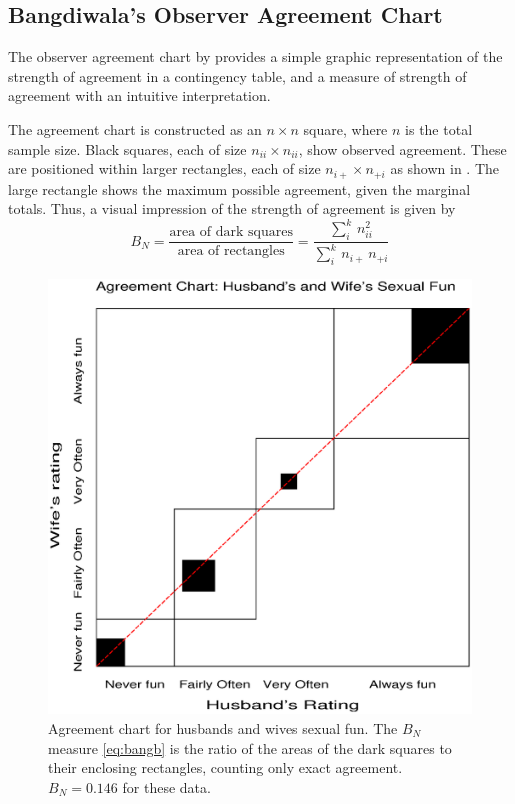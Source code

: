 \subsection[Observer Agreement Chart]{Bangdiwala's Observer Agreement Chart}
\label{sec:twoway:Bangdiwala}
The observer agreement chart by
\citet{Bangdiwala:87} provides a simple
graphic representation of the strength of agreement in a contingency
table, and a measure of strength of agreement with an intuitive
interpretation.

The agreement chart is constructed as an \(n \times  n\) square,
where $n$ is the total sample size.  Black squares, each of size
\(n_{ii} \times  n_{ii}\), show observed agreement.  These are positioned
within larger rectangles, each of size \(n_{i+} \times  n_{+i}\)
as shown in .  The
large rectangle shows the maximum possible agreement, given the
marginal totals.  Thus, a visual impression of the strength of
agreement is given by
\begin{equation}\label{eq:bangb}
  B_N  =
  \frac{ \mbox{area of dark squares}}
  { \mbox{area of rectangles}}  =
  \frac{ \sum_i^k \,  n_{ii}^2 }
  { \sum_i^k \,  n_{i+} \,  n_{+i} }
\end{equation}

\begin{figure}[htb]
  \centering
  \includegraphics[scale=.5]{ch3/fig/agree11}
  \caption[Agreement chart]{Agreement chart for husbands and wives
sexual fun.  The \(B_N\) measure \eqref{eq:bangb} is the ratio of the areas of the
dark squares to their enclosing rectangles, counting only exact
agreement.  \(B_N = 0.146\) for these data.}\label{fig:agree11}

\end{figure}

